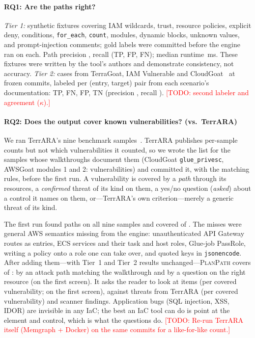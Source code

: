 \documentclass[sigconf,review,anonymous]{acmart}
\newcommand{\sys}{\textsc{PlanPath}\xspace}   %
\newcommand{\todo}[1]{\textcolor{red}{[TODO: #1]}}
\begin{document}
\paragraph{RQ1: Are the paths right?} \emph{Tier 1:} \NumTOneFixtures synthetic fixtures covering IAM wildcards, trust,
resource policies, explicit deny, conditions, \texttt{for\_each}, \texttt{count}, modules, dynamic blocks, unknown values,
and prompt-injection comments; gold labels were committed before the engine ran on each. Path precision
\NumTOnePathPrecision, recall \NumTOnePathRecall (\NumTOnePathTP TP, \NumTOnePathFP FP, \NumTOnePathFN FN); median runtime
\NumTOneMedianMs\,ms. These fixtures were written by the tool's authors and demonstrate consistency, not accuracy.
\emph{Tier 2:} \NumTTwoCases cases from TerraGoat, IAM Vulnerable and CloudGoat~\cite{terragoat,iamvulnerable,cloudgoat} at frozen
commits, labeled per (entry, target) pair from each scenario's documentation: \NumTTwoTP TP, \NumTTwoFN FN, \NumTTwoFP FP,
\NumTTwoTN TN (precision \NumTTwoPrecision, recall \NumTTwoRecall). \todo{second labeler and agreement ($\kappa$).}

\paragraph{RQ2: Does the output cover known vulnerabilities? (vs.\ TerrARA)} We ran TerrARA's nine benchmark
samples~\cite{terrara-repo,cloudgoat,kaimonkey,awsgoat}. TerrARA publishes per-sample counts but not which vulnerabilities it
counted, so we wrote the list for the samples whose walkthroughs document them (CloudGoat \texttt{glue\_privesc}, AWSGoat
modules 1 and 2: \NumTBVulns vulnerabilities) and committed it, with the matching rules, before the first run. A vulnerability
is covered by a \emph{path} through its resources, a \emph{confirmed} threat of its kind on them, a yes/no question
(\emph{asked}) about a control it names on them, or---TerrARA's own criterion---merely a generic threat of its kind.

The first run found \NumTBFirstRunPaths paths on all nine samples and covered \NumTBFirstRunCovered of \NumTBVulns. The misses
were general AWS semantics missing from the engine: unauthenticated API Gateway routes as entries, ECS services and their
task and host roles, Glue-job PassRole, writing a policy onto a role one can take over, and quoted keys in
\texttt{jsonencode}. After adding them---with Tier~1 and Tier~2 results unchanged---\sys covers \NumTBDeveloper of
\NumTBVulns: \NumTBPath by an attack path matching the walkthrough and \NumTBAsked by a question on the right resource
(\NumTBFirstScreen on the first screen). It asks the reader to look at \NumTBItems items (\NumTBItemsPerVuln per covered
vulnerability; \NumTBItemsFirst on the first screen), against \NumTBTerraraThreats threats from TerrARA
(\NumTBTerraraPerVuln per covered vulnerability) and \NumTBScannerFindings scanner findings. Application bugs (SQL injection,
XSS, IDOR) are invisible in any IaC; the best an IaC tool can do is point at the element and control, which is what the
questions do. \todo{Re-run TerrARA itself (Memgraph + Docker) on the same commits for a like-for-like count.}
\end{document}
